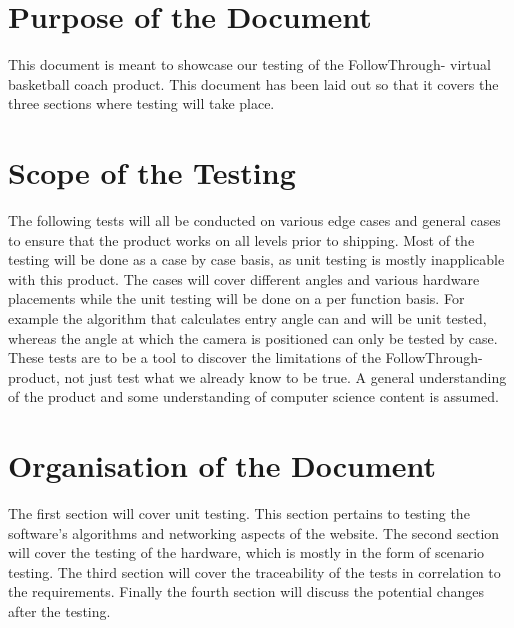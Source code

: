 \section{Purpose of the Document}
This document is meant to showcase our testing of the FollowThrough- virtual basketball coach product. This document has been laid out so that it covers the three sections where testing will take place.

\section{Scope of the Testing}
The following tests will all be conducted on various edge cases and general cases to ensure that the product works on all levels prior to shipping. Most of the testing will be done as a case by case basis, as unit testing is mostly inapplicable with this product. The cases will cover different angles and various hardware placements while the unit testing will be done on a per function basis. For example the algorithm that calculates entry angle can and will be unit tested, whereas the angle at which the camera is positioned can only be tested by case.\\

These tests are to be a tool to discover the limitations of the FollowThrough- product, not just test what we already know to be true. A general understanding of the product and some understanding of computer science content is assumed.

\section{Organisation of the Document}
The first section will cover unit testing. This section pertains to testing the software's algorithms and networking aspects of the website. The second section will cover the testing of the hardware, which is mostly in the form of scenario testing. The third section will cover the traceability of the tests in correlation to the requirements. Finally the fourth section will discuss the potential changes after the testing. 